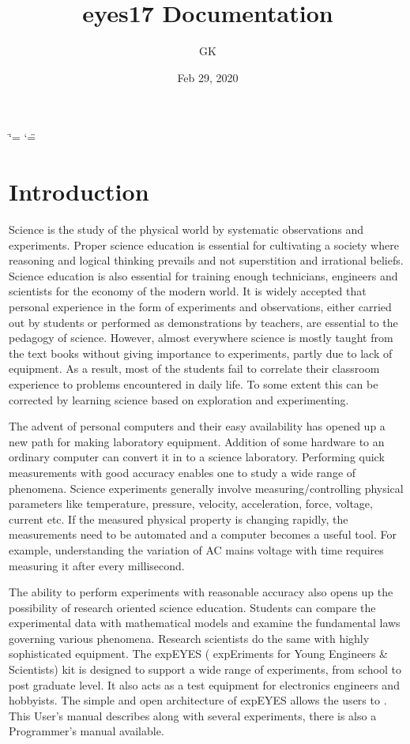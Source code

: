 \documentclass[a4paper,12pt,english]{sphinxmanual}
\title{eyes17 Documentation}
\date{Feb 29, 2020}
\author{GK}
\begin{document}
\ifdefined\shorthandoff
  \ifnum\catcode`\=\string=\active\shorthandoff{=}\fi
  \ifnum\catcode`\"=\active{}\fi
\fi

\pagestyle{empty}


\pagestyle{plain}
\sphinxtableofcontents
\pagestyle{normal}
\label{\detokenize{index::doc}}



\chapter{Introduction}
\label{\detokenize{1.1:introduction}}\label{\detokenize{1.1::doc}}
Science is the study of the physical world by systematic observations
and experiments. Proper science education is essential for cultivating a
society where reasoning and logical thinking prevails and not
superstition and irrational beliefs. Science education is also essential
for training enough technicians, engineers and scientists for the
economy of the modern world. It is widely accepted that personal
experience in the form of experiments and observations, either carried
out by students or performed as demonstrations by teachers, are
essential to the pedagogy of science. However, almost everywhere science
is mostly taught from the text books without giving importance to
experiments, partly due to lack of equipment. As a result, most of the
students fail to correlate their classroom experience to problems
encountered in daily life. To some extent this can be corrected by
learning science based on exploration and experimenting.

The advent of personal computers and their easy availability has opened
up a new path for making laboratory equipment. Addition of some hardware
to an ordinary computer can convert it in to a science laboratory.
Performing quick measurements with good accuracy enables one to study a
wide range of phenomena. Science experiments generally involve
measuring/controlling physical parameters like temperature, pressure,
velocity, acceleration, force, voltage, current etc. If the measured
physical property is changing rapidly, the measurements need to be
automated and a computer becomes a useful tool. For example,
understanding the variation of AC mains voltage with time requires
measuring it after every millisecond.

The ability to perform experiments with reasonable accuracy also opens
up the possibility of research oriented science education. Students can
compare the experimental data with mathematical models and examine the
fundamental laws governing various phenomena. Research scientists do the
same with highly sophisticated equipment. The expEYES ( expEriments for
Young Engineers \& Scientists) kit is designed to support a wide range of
experiments, from school to post graduate level. It also acts as a test
equipment for electronics engineers and hobbyists. The simple and open
architecture of expEYES allows the users to . This User’s manual describes  along with
several experiments, there is also a Programmer’s manual available.
\end{document}
